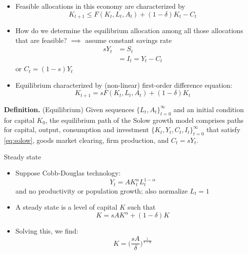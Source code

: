 \documentclass[10pt]{beamer}
\begin{document}
\begin{frame}{}
\begin{itemize}
\item Feasible allocations in this economy are characterized by
\begin{equation*}
	K_{t+1} \leq F(K_t, L_t, A_t) + (1-\delta)K_t - C_t 
\end{equation*}

\item How do we determine the equilibrium allocation among all those allocations that are feasible? $\implies$ assume constant savings rate
\begin{align*}
	s Y_t &= S_t \\
	&= I_t = Y_t - C_t
\end{align*}
or $C_t = (1-s) Y_t$

\item Equilibrium characterized by (non-linear) first-order difference equation:
\begin{equation}\label{eq:solow}
	K_{t+1} = s F(K_t, L_t, A_t) + (1-\delta) K_t
\end{equation}
\end{itemize}

\textbf{Definition.} (Equilibrium) Given sequences $\{L_t, A_t\}_{t=0}^\infty$ and an initial condition for capital $K_0$, the equilibrium path of the Solow growth model comprises paths for capital, output, consumption and investment $\{K_t, Y_t, C_t, I_t\}_{t=0}^\infty$ that satisfy \eqref{eq:solow}, goods market clearing, firm production, and $C_t = sY_t$.
\end{frame}


\begin{frame}{Steady state}
\begin{itemize}
\item Suppose Cobb-Douglas technology:
\begin{equation*}
	Y_t = A K_t^\alpha L_t^{1-\alpha}
\end{equation*}
and no productivity or population growth; also normalize $L_t = 1$

\item A steady state is a level of capital $K$ such that 
\begin{equation*}
	K = s A K^\alpha + (1-\delta) K
\end{equation*}

\item Solving this, we find:
\begin{equation*}
	K = \bigg(\frac{sA}{\delta}\bigg)^\frac{1}{1-\alpha}
\end{equation*}
\end{itemize}

\end{frame}
\end{document}
